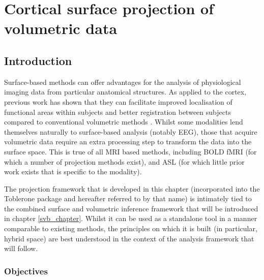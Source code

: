  

\chapter{Cortical surface projection of volumetric data}
\label{projection_chapter}

\section{Introduction}

Surface-based methods can offer advantages for the analysis of physiological imaging data from particular anatomical structures. As applied to the cortex, previous work has shown that they can facilitate improved localisation of functional areas within subjects and better registration between subjects compared to conventional volumetric methods \cite{Glasser2016, Coalson2017}. Whilst some modalities lend themselves naturally to surface-based analysis (notably EEG), those that acquire volumetric data require an extra processing step to transform the data into the surface space. This is true of all MRI based methods, including BOLD fMRI (for which a number of projection methods exist), and ASL (for which little prior work exists that is specific to the modality). 

The projection framework that is developed in this chapter (incorporated into the Toblerone package and hereafter referred to by that name) is intimately tied to the combined surface and volumetric inference framework that will be introduced in chapter \ref{svb_chapter}. Whilst it can be used as a standalone tool in a manner comparable to existing methods, the principles on which it is built (in particular, hybrid space) are best understood in the context of the analysis framework that will follow. 


\subsection{Objectives}

